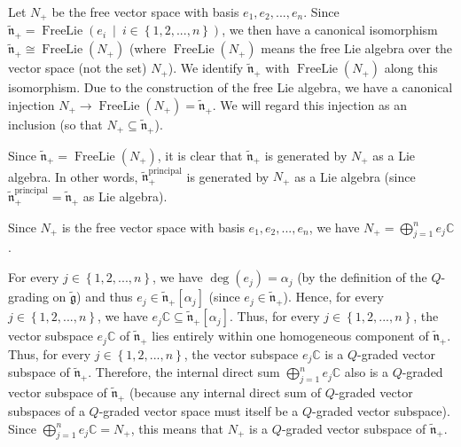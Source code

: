 \documentclass[etingof-lie.tex]{subfiles}
\begin{document}
\begin{verlong}
Let $N_{+}$ be the free vector space with basis $e_{1},e_{2},...,e_{n}$. Since
$\widetilde{\mathfrak{n}}_{+}=\operatorname*{FreeLie}\left(  e_{i}\ \mid
\ i\in\left\{  1,2,...,n\right\}  \right)  $, we then have a canonical
isomorphism $\widetilde{\mathfrak{n}}_{+}\cong\operatorname*{FreeLie}\left(
N_{+}\right)  $ (where $\operatorname*{FreeLie}\left(  N_{+}\right)  $ means
the free Lie algebra over the vector space (not the set) $N_{+}$). We identify
$\widetilde{\mathfrak{n}}_{+}$ with $\operatorname*{FreeLie}\left(
N_{+}\right)  $ along this isomorphism. Due to the construction of the free
Lie algebra, we have a canonical injection $N_{+}\rightarrow
\operatorname*{FreeLie}\left(  N_{+}\right)  =\widetilde{\mathfrak{n}}_{+}$.
We will regard this injection as an inclusion (so that $N_{+}\subseteq
\widetilde{\mathfrak{n}}_{+}$).

Since $\widetilde{\mathfrak{n}}_{+}=\operatorname*{FreeLie}\left(
N_{+}\right)  $, it is clear that $\widetilde{\mathfrak{n}}_{+}$ is generated
by $N_{+}$ as a Lie algebra. In other words, $\widetilde{\mathfrak{n}}%
_{+}^{\operatorname*{principal}}$ is generated by $N_{+}$ as a Lie algebra
(since $\widetilde{\mathfrak{n}}_{+}^{\operatorname*{principal}}%
=\widetilde{\mathfrak{n}}_{+}$ as Lie algebra).

Since $N_{+}$ is the free vector space with basis $e_{1},e_{2},...,e_{n}$, we
have $N_{+}=\bigoplus\limits_{j=1}^{n}e_{j}\mathbb{C}$.

For every $j\in\left\{  1,2,...,n\right\}  $, we have $\deg\left(
e_{j}\right)  =\alpha_{j}$ (by the definition of the $Q$-grading on
$\widetilde{\mathfrak{g}}$) and thus $e_{j}\in\widetilde{\mathfrak{n}}%
_{+}\left[  \alpha_{j}\right]  $ (since $e_{j}\in\widetilde{\mathfrak{n}}_{+}%
$). Hence, for every $j\in\left\{  1,2,...,n\right\}  $, we have
$e_{j}\mathbb{C}\subseteq\widetilde{\mathfrak{n}}_{+}\left[  \alpha
_{j}\right]  $. Thus, for every $j\in\left\{  1,2,...,n\right\}  $, the vector
subspace $e_{j}\mathbb{C}$ of $\widetilde{\mathfrak{n}}_{+}$ lies entirely
within one homogeneous component of $\widetilde{\mathfrak{n}}_{+}$. Thus, for
every $j\in\left\{  1,2,...,n\right\}  $, the vector subspace $e_{j}%
\mathbb{C}$ is a $Q$-graded vector subspace of $\widetilde{\mathfrak{n}}_{+}$.
Therefore, the internal direct sum $\bigoplus\limits_{j=1}^{n}e_{j}\mathbb{C}$
also is a $Q$-graded vector subspace of $\widetilde{\mathfrak{n}}_{+}$
(because any internal direct sum of $Q$-graded vector subspaces of a
$Q$-graded vector space must itself be a $Q$-graded vector subspace). Since
$\bigoplus\limits_{j=1}^{n}e_{j}\mathbb{C}=N_{+}$, this means that $N_{+}$ is
a $Q$-graded vector subspace of $\widetilde{\mathfrak{n}}_{+}$.


\end{verlong}
\end{document}
